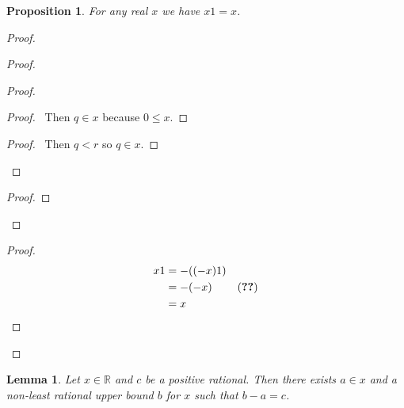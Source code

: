 \documentclass{book}
\let\qed\relax
\newtheorem{prop}[ax]{Proposition}
\newtheorem{lm}[ax]{Lemma}
\theoremstyle{definition}
\begin{document}
\begin{prop}
For any real $x$ we have $x1 = x$.
\end{prop}

\begin{proof}
\pf
{}
\begin{proof}
	\begin{proof}
		\begin{proof}
			\pf\ Then $q \in x$ because $0 \leq x$.
		\end{proof}
		\begin{proof}
			\pf\ Then $q < r$ so $q \in x$.
		\end{proof}
	\end{proof}
	\begin{proof}
	\end{proof}
\end{proof}
\begin{proof}
	\pf
	\begin{align*}
		x1 & = -((-x)1) \\
		& = -(-x) & (\text{\stepref{1}}) \\
		& = x
	\end{align*}
\end{proof}
\qed
\end{proof}

\begin{lm}
\label{lm:Rmultinv}
Let $x \in \mathbb{R}$ and $c$ be a positive rational. Then there exists $a \in x$ and a non-least rational upper bound $b$ for $x$ such that $b-a = c$.
\end{lm}
\end{document}
